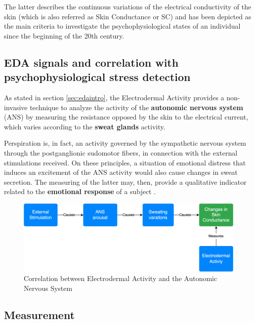 The latter describes the continuous variations of the electrical conductivity of the skin (which is also referred as Skin Conductance or SC) and has been depicted as the main criteria to investigate the psychophysiological states of an individual since the beginning of the 20th century.

\subsection{EDA signals and correlation with psychophysiological stress detection}\label{subsec:eda-signals}

As stated in section \ref{sec:edaintro}, the Electrodermal Activity provides a non-invasive technique to analyze the activity of the \textbf{autonomic nervous system} (ANS) by measuring the resistance opposed by the skin to the electrical current, which varies according to the \textbf{sweat glands} activity.

Perspiration is, in fact, an activity governed by the sympathetic nervous system \cite{bartholomew} through the postganglionic sudomotor fibers, in connection with the external stimulations received. On these principles, a situation of emotional distress that induces an excitement of the ANS activity would also cause changes in sweat secretion. The measuring of the latter may, then, provide a qualitative indicator related to the \textbf{emotional response} of a subject \cite{carlson}.

\begin{figure}[h]
    \centering
    \includegraphics[width=\textwidth]{./images/eda-cause-effect.drawio.png}
    \caption{Correlation between Electrodermal Activity and the Autonomic Nervous System}
    \label{fig:eda-ans}
\end{figure}

\subsection{Measurement}\label{subsec:eda-measurement}


